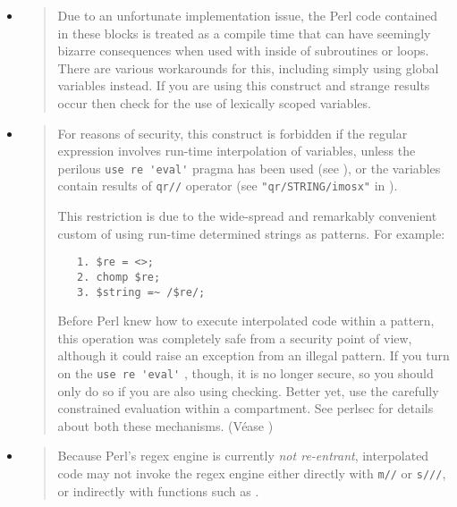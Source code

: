 \begin{itemize}
\item
\begin{it}\begin{quote}
Due to an unfortunate implementation issue, the Perl code contained
in these blocks is treated as a compile time  that can have
seemingly bizarre consequences when used with 
inside of subroutines or loops. There are various workarounds for this,
including simply using global variables instead. If you are using this
construct and strange results occur then check for the use of lexically
scoped variables.
\end{quote}\end{it}
\item
\begin{it}\begin{quote}
For reasons of security, this construct is forbidden if the regular
expression involves run-time interpolation of variables, unless the
perilous \verb|use re 'eval'| pragma has been used (see ),
or the variables
contain results of \verb|qr//| operator (see \verb|"qr/STRING/imosx"| in 
).

This restriction is due to the wide-spread and remarkably convenient
custom of using run-time determined strings as patterns. For example:

\begin{verbatim}
   1. $re = <>;
   2. chomp $re;
   3. $string =~ /$re/;
\end{verbatim}

Before Perl knew how to execute interpolated code within a pattern, this
operation was completely safe from a security point of view, although
it could raise an exception from an illegal pattern. If you turn on the
\verb|use re 'eval'| , though, it is no longer secure, so you should only do
so if you are also using  checking. Better yet, use the carefully
constrained evaluation within a  compartment. See perlsec for details
about both these mechanisms. (Véase )
\end{quote}\end{it} 

\item
\begin{it}\begin{quote}
Because Perl's regex engine is currently \emph{not re-entrant}, interpolated
code may not invoke the regex engine either directly with \verb|m//| or 
\verb|s///|, or indirectly with functions such as .
\end{quote}\end{it}
\end{itemize}

